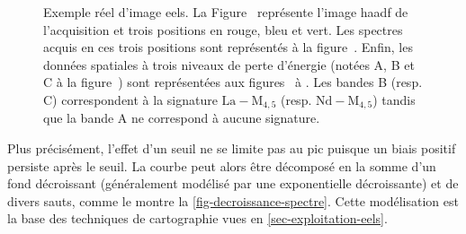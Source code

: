 \begin{figure}[htbp]
        \caption{Exemple réel d'image \gls{eels}. La Figure~\protect{} représente l'image \gls{haadf} de l'acquisition et trois positions en rouge, bleu et vert. Les spectres acquis en ces trois positions sont représentés à la figure~\protect{}. Enfin, les données spatiales à trois niveaux de perte d'énergie (notées A, B et C à la figure~) sont représentées aux figures~ à . Les bandes B (resp. C) correspondent à la signature $\mathrm{La-M}_{4, 5}$ (resp. $\mathrm{Nd-M}_{4, 5}$) tandis que la bande A ne correspond à aucune signature.
            \protect\label{fig-chap2-eels-real-spectra-figure}}
    \end{figure}

    Plus précisément, l'effet d'un seuil ne se limite pas au pic puisque un biais positif persiste après le seuil. La courbe peut alors être décomposé en la somme d'un fond décroissant (généralement modélisé par une exponentielle décroissante) et de divers sauts, comme le montre la \cref{fig-decroissance-spectre}. Cette modélisation est la base des techniques de cartographie vues en \cref{sec-exploitation-eels}.

